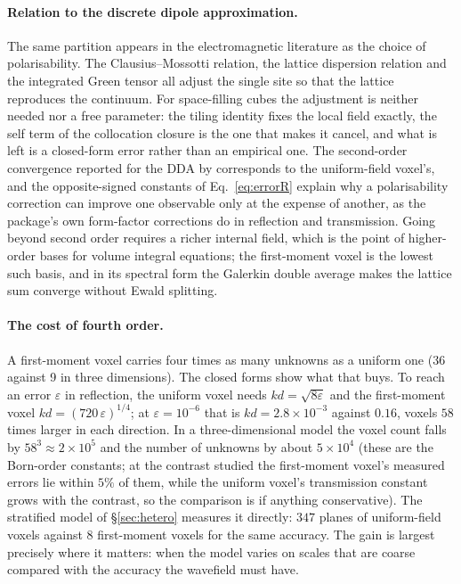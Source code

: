 \documentclass[extra,mreferee]{gji}
\begin{document}
\paragraph{Relation to the discrete dipole approximation.} The same partition appears in the
electromagnetic literature as the choice of polarisability. The Clausius--Mossotti relation, the
lattice dispersion relation \citep{Draine1993} and the integrated Green tensor \citep{Chaumet2004} all
adjust the single site so that the lattice reproduces the continuum. For space-filling cubes the
adjustment is neither needed nor a free parameter: the tiling identity fixes the local field exactly, the
self term of the collocation closure is the one that makes it cancel, and what is left is a
closed-form error rather than an empirical one. The second-order convergence reported for the DDA
by \citet{Yurkin2006} corresponds to the uniform-field voxel's, and the opposite-signed constants of
Eq.~\eqref{eq:errorR} explain why a polarisability correction can improve one observable only at
the expense of another, as the package's own form-factor corrections do in reflection and
transmission. Going beyond second order requires a richer internal field, which is the point of
higher-order bases for volume integral equations; the first-moment voxel is the lowest such basis,
and in its spectral form the Galerkin double average makes the lattice sum converge without Ewald
splitting.

\paragraph{The cost of fourth order.} A first-moment voxel carries four times as many unknowns as
a uniform one (36 against 9 in three dimensions). The closed forms show what that buys. To reach an
error $\varepsilon$ in reflection, the uniform voxel needs $kd=\sqrt{8\varepsilon}$ and the
first-moment voxel $kd=(720\,\varepsilon)^{1/4}$; at $\varepsilon=10^{-6}$ that is $kd=2.8\times
10^{-3}$ against $0.16$, voxels $58$ times larger in each direction. In a three-dimensional model the
voxel count falls by $58^3\approx2\times10^5$ and the number of unknowns by about $5\times10^4$
(these are the Born-order constants; at the contrast studied the first-moment voxel's measured errors
lie within $5\%$ of them, while the uniform voxel's transmission constant grows with the contrast, so
the comparison is if anything conservative).
The stratified model of \S\ref{sec:hetero} measures it directly: $347$ planes of uniform-field voxels
against $8$ first-moment voxels for the same accuracy. The gain is largest precisely where it matters: when the model varies on scales that are coarse
compared with the accuracy the wavefield must have.
\end{document}
